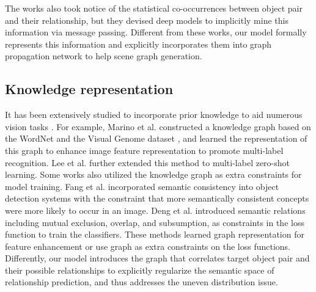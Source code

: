 \documentclass[10pt,twocolumn,letterpaper]{article}
\begin{document}
The works \cite{dai2017detecting,zellers2017neural} also took notice of the statistical co-occurrences between object pair and their relationship, but they devised deep models to implicitly mine this information via message passing. Different from these works, our model formally represents this information and explicitly incorporates them into graph propagation network to help scene graph generation. 

\subsection{Knowledge representation}
It has been extensively studied to incorporate prior knowledge to aid numerous vision tasks \cite{marino2017more,fang2017object,lee2017multi,deng2014large,chen2018neural,lin2017knowledge}. For example, Marino et al. \cite{marino2017more} constructed a knowledge graph based on the WordNet \cite{miller1995wordnet} and the Visual Genome dataset \cite{krishna2017visual}, and learned the representation of this graph to enhance image feature representation to promote multi-label recognition. Lee et al. \cite{lee2017multi} further extended this method to multi-label zero-shot learning. Some works also utilized the knowledge graph as extra constraints for model training. Fang et al. \cite{fang2017object} incorporated semantic consistency into object detection systems with the constraint that more semantically consistent concepts were more likely to occur in an image. Deng et al. \cite{deng2014large} introduced semantic relations including mutual exclusion, overlap, and subsumption, as constraints in the loss function to train the classifiers. These methods learned graph representation for feature enhancement or use graph as extra constraints on the loss functions. Differently, our model introduces the graph that correlates target object pair and their possible relationships to explicitly regularize the semantic space of relationship prediction, and thus addresses the uneven distribution issue.
\end{document}

